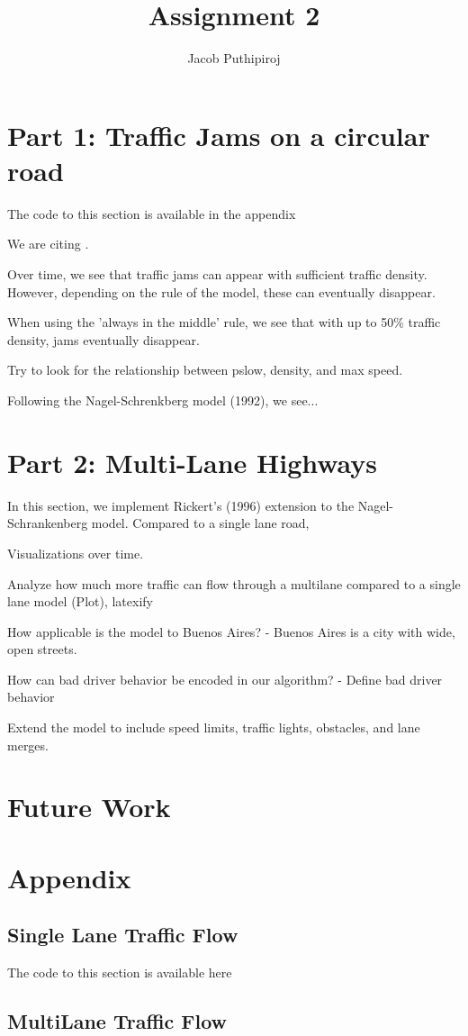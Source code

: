 \documentclass{article}
\begin{document}
\title{Assignment 2}
\author{Jacob Puthipiroj}
\maketitle

\section*{Part 1: Traffic Jams on a circular road}
The code to this section is available in the appendix

We are citing \cite{nagel1992cellular}.

Over time, we see that traffic jams can appear with sufficient traffic density. However, depending on the rule of the model, these can eventually disappear.

When using the 'always in the middle' rule, we see that with up to 50\% traffic density, jams eventually disappear. 

Try to look for the relationship between pslow, density, and max speed. 

Following the Nagel-Schrenkberg model (1992), we see... 

\section*{Part 2: Multi-Lane Highways}

In this section, we implement Rickert's (1996) extension to the Nagel-Schrankenberg model. Compared to a single lane road, 

Visualizations over time. 

Analyze how much more traffic can flow through a multilane compared to a single lane model (Plot), latexify


How applicable is the model to Buenos Aires?
- Buenos Aires is a city with wide, open streets. 

How can bad driver behavior be encoded in our algorithm?
- Define bad driver behavior

Extend the model to include speed limits, traffic lights, obstacles, and lane merges. 

\section*{Future Work}



















\section*{Appendix}
\subsection*{Single Lane Traffic Flow}
The code to this section is available here

\subsection*{MultiLane Traffic Flow}
\end{document}

